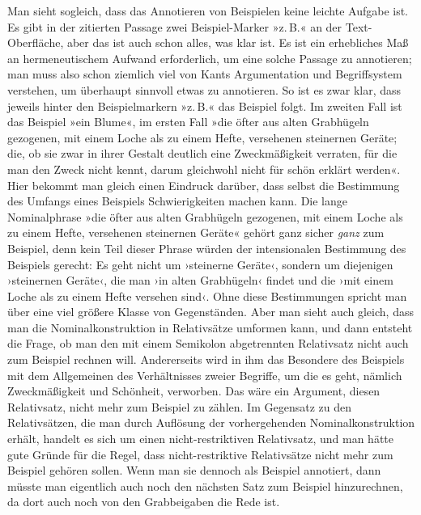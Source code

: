 \documentclass{article}
\begin{document}
Man sieht sogleich, dass das Annotieren von Beispielen keine leichte
Aufgabe ist. Es gibt in der zitierten Passage zwei Beispiel-Marker
»z.\,B.« an der Text-Oberfläche, aber das ist auch schon alles, was
klar ist. Es ist ein erhebliches Maß an hermeneutischem Aufwand
erforderlich, um eine solche Passage zu annotieren; man muss also
schon ziemlich viel von Kants Argumentation und Begriffsystem
verstehen, um überhaupt sinnvoll etwas zu annotieren. So ist es zwar
klar, dass jeweils hinter den Beispielmarkern »z.\,B.« das Beispiel
folgt. Im zweiten Fall ist das Beispiel »ein Blume«, im ersten Fall
»die öfter aus alten Grabhügeln gezogenen, mit einem Loche als zu
einem Hefte, versehenen steinernen Geräte; die, ob sie zwar in ihrer
Gestalt deutlich eine Zweckmäßigkeit verraten, für die man den Zweck
nicht kennt, darum gleichwohl nicht für schön erklärt werden«. Hier
bekommt man gleich einen Eindruck darüber, dass selbst die Bestimmung
des Umfangs eines Beispiels Schwierigkeiten machen kann. Die lange
Nominalphrase »die öfter aus alten Grabhügeln gezogenen, mit einem
Loche als zu einem Hefte, versehenen steinernen Geräte« gehört ganz
sicher \emph{ganz} zum Beispiel, denn kein Teil dieser Phrase würden
der intensionalen Bestimmung des Beispiels gerecht: Es geht nicht um
›steinerne Geräte‹, sondern um diejenigen ›steinernen Geräte‹, die man
›in alten Grabhügeln‹ findet und die ›mit einem Loche als zu einem
Hefte versehen sind‹. Ohne diese Bestimmungen spricht man über eine
viel größere Klasse von Gegenständen. Aber man sieht auch gleich, dass
man die Nominalkonstruktion in Relativsätze umformen kann, und dann
entsteht die Frage, ob man den mit einem Semikolon abgetrennten
Relativsatz nicht auch zum Beispiel rechnen will. Andererseits wird in
ihm das Besondere des Beispiels mit dem Allgemeinen des Verhältnisses
zweier Begriffe, um die es geht, nämlich Zweckmäßigkeit und Schönheit,
verworben. Das wäre ein Argument, diesen Relativsatz, nicht mehr zum
Beispiel zu zählen. Im Gegensatz zu den Relativsätzen, die man durch
Auflösung der vorhergehenden Nominalkonstruktion erhält, handelt es
sich um einen nicht-restriktiven Relativsatz, und man hätte gute
Gründe für die Regel, dass nicht-restriktive Relativsätze nicht mehr
zum Beispiel gehören sollen. Wenn man sie dennoch als Beispiel
annotiert, dann müsste man eigentlich auch noch den nächsten Satz zum
Beispiel hinzurechnen, da dort auch noch von den Grabbeigaben die Rede
ist.
\end{document}
